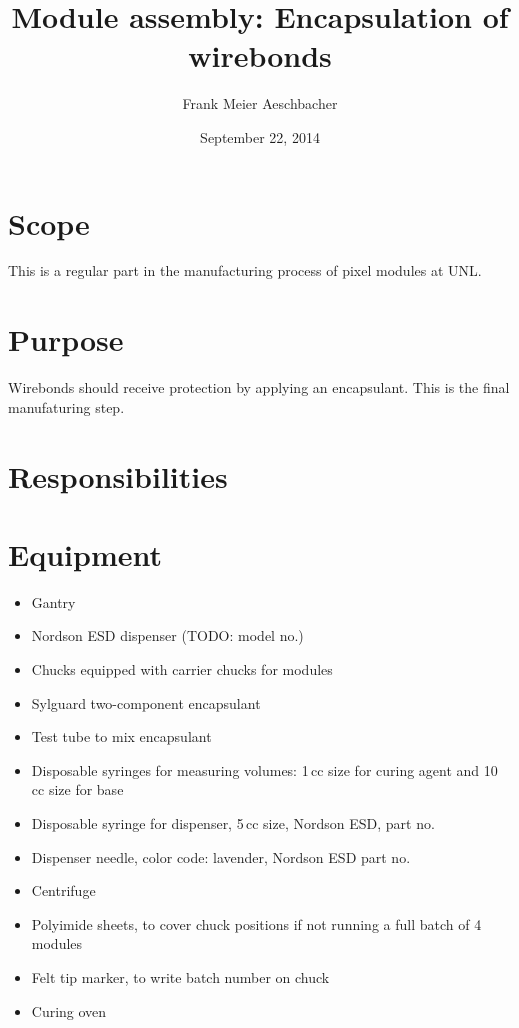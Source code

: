 \documentclass[12pt]{unlsilabsop}
\title{Module assembly: Encapsulation of wirebonds}
\date{September 22, 2014}
\author{Frank Meier Aeschbacher}
\begin{document}
\maketitle

\section{Scope}
This is a regular part in the manufacturing process of pixel modules at UNL.

\section{Purpose}
Wirebonds should receive protection by applying an encapsulant. This is the final manufaturing step.


\section{Responsibilities}

\section{Equipment}

\begin{itemize}
    \item Gantry
    \item Nordson ESD dispenser (TODO: model no.)
    \item Chucks equipped with carrier chucks for modules
    \item Sylguard two-component encapsulant
    \item Test tube to mix encapsulant
    \item Disposable syringes for measuring volumes: 1\,cc size for curing agent and 10\,cc size for base
    \item Disposable syringe for dispenser, 5\,cc size, Nordson ESD, part no.
    \item Dispenser needle, color code: lavender, Nordson ESD part no.
    \item Centrifuge
    \item Polyimide sheets, to cover chuck positions if not running a full batch of 4 modules
    \item Felt tip marker, to write batch number on chuck
    \item Curing oven
\end{itemize}
\end{document}
